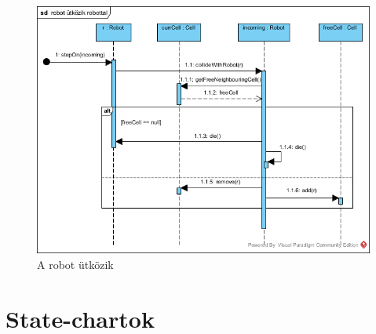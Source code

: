 \begin{figure}[!htbp]
	\begin{center}
		\includegraphics[width=166mm, center]{./vegleges_statikus_seq/robot_collide_robot.png}
		\caption{A robot ütközik}
	\end{center}
\end{figure}



\section{State-chartok}


\begin{figure}[h]
\begin{center}
\label{fig:example3}
\end{center}
\end{figure}

